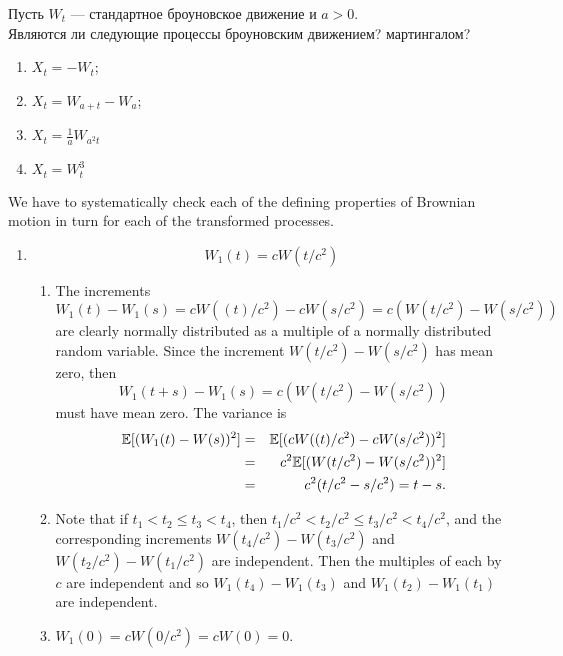 \begin{problem}
Пусть $W_{t}$ — стандартное броуновское движение и $a>0$. \\
Являются ли следующие процессы броуновским движением? мартингалом? \\
\begin{enumerate}
\item $X_{t}=-W_{t}$;
\item $X_{t}=W_{a+t}-W_{a}$;
\item $X_{t}=\frac{1}{a}W_{a^{2}t}$
\item $X_{t}=W_{t}^{3}$
\end{enumerate}
\begin{sol}

We have to systematically check each of the defining properties
of Brownian motion in turn for each of the transformed processes.
\begin{enumerate}
  \item
    \[
      W_1(t) = cW(t/c^2)
    \]
    \begin{enumerate}
       \item
       The increments
       \[
         W_1(t) - W_1(s) = cW( (t)/c^2 ) - cW(s/c^2) = c
         ( W( t/c^2  ) - W( s/c^2 ))
       \]
       are clearly normally distributed as a multiple of a
       normally distributed random variable.  Since the
       increment $ W( t/c^2 ) - W( s/c^2 ) $ has
       mean zero, then
       \[
         W_1(t+s) - W_1(s) = c ( W( t/c^2 ) - W( s/c^2
         ))
       \]
       must have mean zero.  The variance is
       \begin{eqnarray*}
         \mathbb{E}[(W_1(t)-W(s))^2] &=& \mathbb{E}[(c W((t)/c^2) - c W(s/c^2))^2]
         \\
         &=& c^2 \mathbb{E}[ (W( t/c^2 ) - W(s/c^2))^2] \\
         &=& c^2 (t/c^2 - s/c^2) = t - s.
       \end{eqnarray*}

       \item
       Note that if $ t_1 < t_2 \le t_3 < t_4 $, then $ t_1/c^2
       < t_2/c^2 \le t_3/c^2 < t_4/c^2 $, and the corresponding
       increments $ W(t_4/c^2) - W(t_3/c^2) $ and $ W(t_2/c^2)
       - W(t_1/c^2) $ are independent.  Then the multiples of
       each by $ c $ are independent and so $ W_1(t_4) - W_1(t_3)
       $ and $ W_1(t_2) - W_1(t_1) $ are independent.

       \item
       $ W_1(0) = c W(0/c^2) = c W(0) = 0 $.


\end{enumerate}
\end{enumerate}
\end{sol}
\end{problem}
